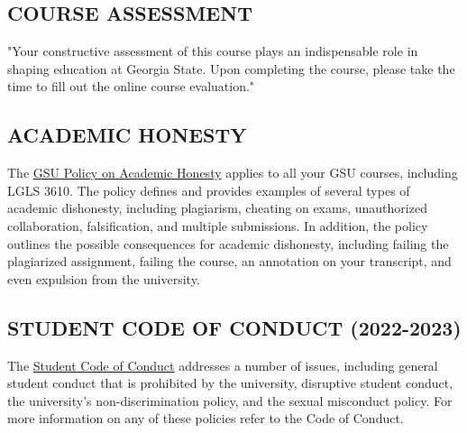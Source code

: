 \documentclass{article}
\begin{document}
\subsection{COURSE ASSESSMENT}
"Your constructive assessment of this course plays an indispensable role in shaping education at Georgia State.  Upon completing the course, please take the time to fill out the online course evaluation."

\subsection{ACADEMIC HONESTY}
The \href{https://provost.gsu.edu/document/academic-honesty-policy/}{GSU Policy on Academic Honesty} applies to all your GSU courses, including LGLS 3610.  The policy defines and provides examples of several types of academic dishonesty, including plagiarism, cheating on exams, unauthorized collaboration, falsification, and multiple submissions.  In addition, the policy outlines the possible consequences for academic dishonesty, including failing the plagiarized assignment, failing the course, an annotation on your transcript, and even expulsion from the 
university.

\subsection{STUDENT CODE OF CONDUCT (2022-2023)}
The \href{https://codeofconduct.gsu.edu/}{Student Code of Conduct} addresses a number of issues, including general student conduct that is prohibited by the university, disruptive student conduct, the university's non-discrimination policy, and the sexual misconduct policy.  For more information on any of these policies refer to the Code of Conduct.
\end{document}

